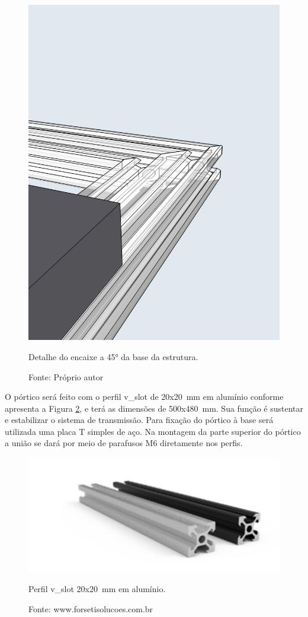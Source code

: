 \begin{figure}[!htb]
\centering
\includegraphics[scale = 0.25]{figuras/detalhe45}
\caption{Detalhe do encaixe a 45° da base da estrutura.}
\caption*{Fonte: Próprio autor}
\label{fig:detalhe45}
\end{figure}
    
O pórtico será feito com o perfil v\_slot de 20x20~mm em alumínio conforme apresenta 
a Figura \ref{fig:p20x20p}, e terá as dimensões de 500x480~mm. Sua função é sustentar 
e estabilizar o sistema de transmissão. Para fixação do pórtico à base será utilizada 
uma placa T simples de aço. Na montagem da parte superior do pórtico a união 
se dará por meio de parafusos M6 diretamente nos perfis.

\begin{figure}[!htb]
\centering
\includegraphics[scale = 0.5]{figuras/p20x20p}
\caption{Perfil v\_slot 20x20~mm em alumínio.}
\caption*{Fonte: www.forsetisolucoes.com.br}
\label{fig:p20x20p}
\end{figure}
    
